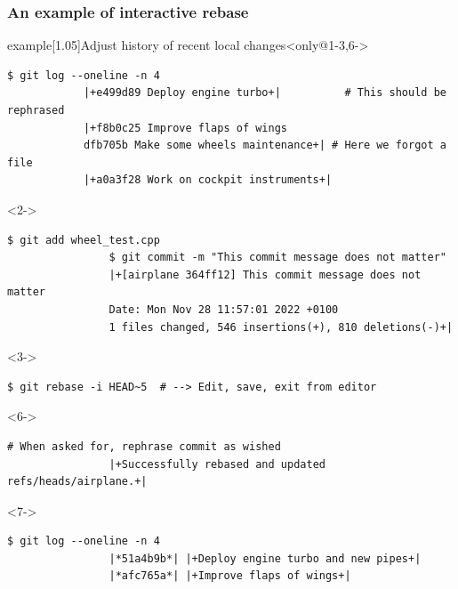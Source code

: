 \documentclass[usenames,svgnames,14pt]{beamer}
\begin{document}
\begin{frame}[c,fragile]
    \frametitle<1-3,6->{An example of interactive rebase}
    \begin{varblock}{example}[1.05\textwidth]{Adjust history of recent local changes}<only@1-3,6->
        \begin{lstlisting}[style=MyBash, aboveskip=2mm]
            $ git log --oneline -n 4
            |+e499d89 Deploy engine turbo+|          # This should be rephrased
            |+f8b0c25 Improve flaps of wings
            dfb705b Make some wheels maintenance+| # Here we forgot a file
            |+a0a3f28 Work on cockpit instruments+|
        \end{lstlisting}
        \begin{uncoverenv}<2->
            \begin{lstlisting}[style=MyBash, aboveskip=-4pt]
                $ git add wheel_test.cpp
                $ git commit -m "This commit message does not matter"
                |+[airplane 364ff12] This commit message does not matter
                Date: Mon Nov 28 11:57:01 2022 +0100
                1 files changed, 546 insertions(+), 810 deletions(-)+|
            \end{lstlisting}
        \end{uncoverenv}
        \begin{uncoverenv}<3->
            \begin{lstlisting}[style=MyBash, aboveskip=-4pt]
                $ git rebase -i HEAD~5  # --> Edit, save, exit from editor
            \end{lstlisting}
        \end{uncoverenv}
        \begin{uncoverenv}<6->
            \begin{lstlisting}[style=MyBash, aboveskip=-4pt]
                # When asked for, rephrase commit as wished
                |+Successfully rebased and updated refs/heads/airplane.+|
            \end{lstlisting}
        \end{uncoverenv}
        \begin{uncoverenv}<7->
            \begin{lstlisting}[style=MyBash, aboveskip=-4pt]
                $ git log --oneline -n 4
                |*51a4b9b*| |+Deploy engine turbo and new pipes+|
                |*afc765a*| |+Improve flaps of wings+|

\end{lstlisting}
\end{uncoverenv}
\end{varblock}
\end{frame}
\end{document}
